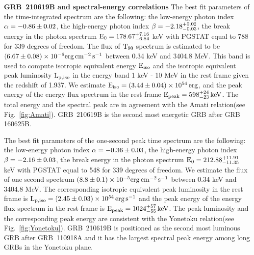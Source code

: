 \documentclass{naturesubmissionstyle}
\begin{document}
{\noindent \bf  GRB~210619B and spectral-energy correlations}
The best fit parameters of the time-integrated spectrum are the following: the low-energy photon index $\rm \alpha=-0.86 \pm 0.02$, the high-energy photon index $\rm \beta=-2.18_{-0.03}^{+0.02}$, the break energy in the photon spectrum 
$\rm E_{0}=178.67_{-6.84}^{+7.16}$ keV with PGSTAT equal to 788 for 339 degrees of freedom. %
The flux of $\rm T_{90}$ spectrum is estimated to be $\rm (6.67 \pm 0.08) \times 10^{-6} erg \, cm^{-2} \, s^{-1}$ between 0.34 keV and 3404.8 MeV. This band is used to compute isotropic equivalent energy $\rm E_{iso}$ and the isotropic equivalent peak luminosity $\rm L_{p,iso}$ in the energy band 1 keV - 10 MeV in the rest frame given the redshift of 1.937. %
We estimate $\rm E_{iso}=(3.44 \pm 0.04) \times 10^{54} \, erg$, and the peak energy of the energy flux spectrum in the rest frame $\rm E_{peak}=598_{-23}^{+24} \, keV$. The total energy and the spectral peak are in agreement with the Amati relation\cite{Amati2002}(see Fig.~\ref{fig:Amati}). GRB~210619B is the second most energetic GRB after GRB 160625B. 

The best fit parameters of the one-second peak time spectrum are the following: the low-energy photon index $\rm \alpha=-0.36 \pm 0.03$, the high-energy photon index $\rm \beta=-2.16 \pm 0.03$, the break energy in the photon spectrum 
$\rm E_{0}=212.88_{-11.35}^{+11.91}$ keV with PGSTAT equal to 548 for 339 degrees of freedom. We estimate the flux of one second spectrum $\rm (8.8 \pm 0.1) \times 10^{-5} erg \, cm^{-2} \, s^{-1}$ between 0.34 keV and 3404.8 MeV. The corresponding isotropic equivalent peak luminosity in the rest frame is $\rm L_{p,iso}=(2.45 \pm 0.03) \times 10^{54} \, erg \, s^{-1}$ and the peak energy of the energy flux spectrum in the rest frame is $\rm E_{peak}= 1024_{-55}^{+57} \, keV$. The peak luminosity and the corresponding peak energy are consistent with the Yonetoku relation\cite{Yonetoku2004}(see Fig.~\ref{fig:Yonetoku}). GRB~210619B is positioned as the second most luminous GRB after GRB~110918A and it has the largest spectral peak energy among long GRBs in the Yonetoku plane.  
\end{document}
